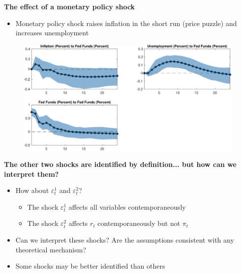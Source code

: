 \documentclass[10pt,english,t,aspectratio=169,ignorenonframetext]{beamer}
\begin{document}

\begin{frame}
{\textbf{The effect of a monetary policy shock}}

\begin{itemize}
\item Monetary policy shock raises inflation in the short run (price puzzle)
and increases unemployment
\end{itemize}

\begin{figure}[h]
\centering\includegraphics[width=.75\textwidth]{SW_IR_3.pdf}
\end{figure}
\end{frame}


\begin{frame}
{\textbf{The other two shocks are identified by definition... but how can we
interpret them?}}\bigskip\bigskip

\begin{itemize}
\item How about $\varepsilon^{1}_{t}$ and $\varepsilon^2_{t}$? \smallskip

\begin{itemize}
\item The shock $\varepsilon^{1}_{t}$ affects all variables
contemporaneously\medskip

\item The shock $\varepsilon^2_{t}$ affects $r_{t}$ contemporaneously but
not $\pi _{t}$\pause\bigskip
\end{itemize}

\item Can we interpret these shocks? Are the assumptions consistent with any
theoretical mechanism? \pause\bigskip

\item Some shocks may be better identified than others
\end{itemize}
\end{frame}
\end{document}
